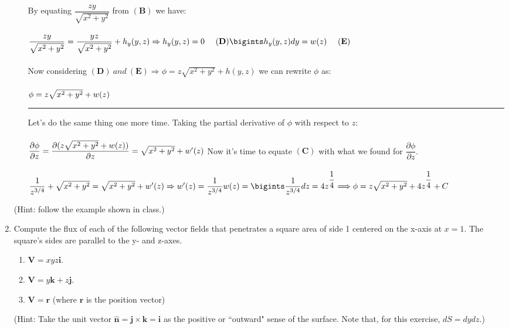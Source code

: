 \documentclass[fleqn]{article}
\begin{document}
\begin{enumerate}
\begin{enumerate}
{            By equating $\dfrac{zy}{\sqrt{x^2+y^2}}$ from $\mathbf{(B)}$ we have: \\
            \\
            $
              \dfrac{zy}{\sqrt{x^2+y^2}}=\dfrac{yz}{\sqrt{x^2+y^2}}+h_y(y,z) \Rightarrow  h_y(y,z)=0 ~~~~ \mathbf{(D)} \\
              \\
              \bigints h_y(y,z) dy=w(z) ~~~~ \mathbf{(E)}
            $ \\ \\
            Now considering $\mathbf{(D)} ~ and ~ \mathbf{(E)} \Rightarrow \phi=z\sqrt{x^2+y^2}+h(y,z)$ we can rewrite $\phi$ as: \\
            \\
            $
              \phi=z\sqrt{x^2+y^2}+w(z) \\
            $
            \rule{15cm}{1pt}
            Let's do the same thing one more time. Taking the partial derivative of $\phi$ with respect to $z$: \\
            \\
            $
              \dfrac{\partial \phi}{\partial z}=\dfrac{\partial (z\sqrt{x^2+y^2}+w(z))}{\partial z}=\sqrt{x^2+y^2}+w^{\prime}(z) \\ \\
            $
            Now it's time to equate $\mathbf{(C)}$ with what we found for $\dfrac{\partial \phi}{\partial z}$. \\
            \\
            $
              \dfrac{1}{z^{3/4}}+\sqrt{x^2+y^2}=\sqrt{x^2+y^2}+w^{\prime}(z) \Rightarrow w^{\prime}(z)=\dfrac{1}{z^{3/4}} \\
              \\
              w(z)=\bigints \dfrac{1}{z^{3/4}} dz=4z^{\dfrac{1}{4}} \\
              \\
              \\
              \Longrightarrow \phi=z\sqrt{x^2+y^2}+4z^{\dfrac{1}{4}}+C
            $
          }

      \end{enumerate}
      (Hint: follow the example shown in class.)


    \item Compute the flux of each of the following vector fields that penetrates a square area
    of side 1 centered on the x-axis at $x=1$. The square's sides are parallel to the y- and z-axes.
      \begin{enumerate}
        \item $\mathbf{V}=xyz\mathbf{i}$.
        \item $\mathbf{V}=y\mathbf{k}+z\mathbf{j}$.
        \item $\mathbf{V}=\mathbf{r}$ (where $\mathbf{r}$ is the position vector)
      \end{enumerate}
      (Hint: Take the unit vector $\mathbf{\hat n}=\mathbf{j} \times \mathbf{k} = \mathbf{i}$ as the positive or ``outward" sense of the surface. Note that, for this exercise, $dS=dy dz$.)



\end{enumerate}
\end{document}
